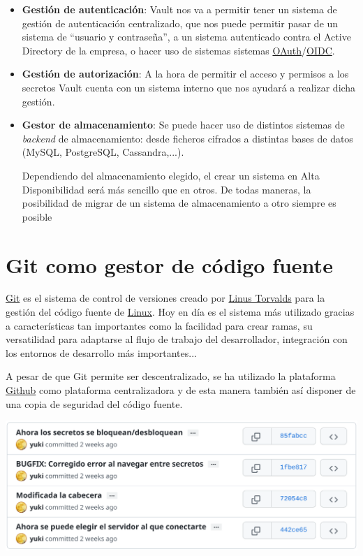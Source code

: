 \documentclass{\ClassPath/viu-tfm-template}
\begin{document}
\begin{itemize}
    \item \textbf{Gestión de autenticación}: Vault nos va a permitir tener un sistema de gestión de autenticación centralizado, que nos puede permitir pasar de un sistema de “usuario y contraseña”, a un sistema autenticado contra el Active Directory de la empresa, o hacer uso de sistemas sistemas \href{https://en.wikipedia.org/wiki/OAuth}{OAuth}/\href{https://en.wikipedia.org/wiki/OpenID#OpenID_Connect_(OIDC)}{OIDC}.

    \item \textbf{Gestión de autorización}: A la hora de permitir el acceso y permisos a los secretos Vault cuenta con un sistema interno que nos ayudará a realizar dicha gestión.

    \item \textbf{Gestor de almacenamiento}: Se puede hacer uso de distintos sistemas de \textit{backend} de almacenamiento: desde ficheros cifrados a distintas bases de datos (MySQL, PostgreSQL, Cassandra,...).

    Dependiendo del almacenamiento elegido, el crear un sistema en Alta Disponibilidad será más sencillo que en otros. De todas maneras, la posibilidad de migrar de un sistema de almacenamiento a otro siempre es posible

\end{itemize}



\section{Git como gestor de código fuente}

\href{https://es.wikipedia.org/wiki/Git}{Git} es el sistema de control de versiones creado por \href{https://es.wikipedia.org/wiki/Linus_Torvalds}{Linus Torvalds} para la gestión del código fuente de \href{https://es.wikipedia.org/wiki/N%C3%BAcleo_Linux}{Linux}. Hoy en día es el sistema más utilizado gracias a características tan importantes como la facilidad para crear ramas, su versatilidad para adaptarse al flujo de trabajo del desarrollador, integración con los entornos de desarrollo más importantes...

A pesar de que Git permite ser descentralizado, se ha utilizado la plataforma \href{https://github.com/}{Github} como plataforma centralizadora y de esta manera también así disponer de una copia de seguridad del código fuente.

\begin{center}
    \includegraphics[width=0.8\linewidth]{img/commits.png}
\end{center}
\end{document}
